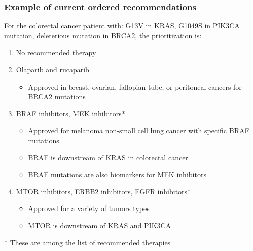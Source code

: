 \documentclass{beamer}
\begin{document}
\begin{frame}
\frametitle{Example of current ordered recommendations}

For the colorectal cancer patient with: G13V in KRAS, G1049S in PIK3CA mutation, deleterious mutation in BRCA2, the prioritization is:
\vspace{0.2cm}

\begin{enumerate}
\item {\color{red}No recommended therapy}
\item {\color{red}Olaparib and rucaparib}
\begin{itemize}
\item Approved in breast, ovarian, fallopian tube, or peritoneal cancers for BRCA2 mutations
\end{itemize}
\item {\color{red}BRAF inhibitors, MEK inhibitors}*
\begin{itemize}
\item Approved for melanoma non-small cell lung cancer with specific BRAF mutations
\item BRAF is downstream of KRAS in colorectal cancer
\item BRAF mutations are also biomarkers for MEK inhibitors
\end{itemize}
\item {\color{red}MTOR inhibitors, ERBB2 inhibitors, EGFR inhibitors}*
\begin{itemize}
\item Approved for a variety of tumors types
\item MTOR is downstream of KRAS and PIK3CA 
\end{itemize}
\end{enumerate}

\vspace{0.2cm}

* These are among the list of recommended therapies

\end{frame}

\end{document}
